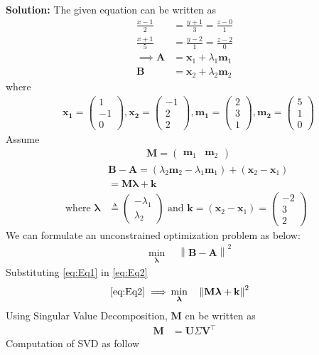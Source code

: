 \documentclass[12pt]{article}
\providecommand{\brak}[1]{\ensuremath{\left(#1\right)}}
\providecommand{\norm}[1]{\left\lVert#1\right\rVert}
\newcommand{\solution}{\noindent \textbf{Solution: }}
\newcommand{\myvec}[1]{\ensuremath{\begin{pmatrix}#1\end{pmatrix}}}
\let\vec\mathbf
\begin{document}
\begin{enumerate}
\solution 
The given equation can be written as
\begin{align}
	\frac{x-1}{2} &= \frac{y+1}{3}=\frac{z-0}{1}\\ 
	\frac{x+1}{5} &= \frac{y-2}{1}= \frac{z-2}{0} \\ 
	\implies 
	\vec{A} &= \vec{x}_1 + \lambda_1\vec{m}_1\\
	\vec{B} &= \vec{x}_2 + \lambda_2\vec{m}_2
\end{align}	
where
\begin{align}
	&\vec{x_1} = \myvec{1\\-1\\0},  
	\vec{x_2} = \myvec{-1\\2\\2},  
	\vec{m_1} = \myvec{2\\3\\1},
	\vec{m_2} = \myvec{5\\1\\0}  
\end{align}	
Assume
\begin{align}
	&\vec{M} = \myvec{\vec{m}_1 & \vec{m}_2} 
\end{align}
\begin{align}
	&\vec{B}-\vec{A} = \brak{\lambda_2\vec{m}_2 - \lambda_1\vec{m}_1} + \brak{\vec{x}_2- \vec{x}_1} \\ 
	\label{eq:Eq1}
	&= \vec{M}\bm{\lambda}+ \vec{k} \\
	\text{ where } \bm{\lambda} &\triangleq \myvec{-\lambda_1\\ \lambda_2}\text{ and }\vec{k} =\brak{\vec{x}_2- \vec{x}_1} = \myvec{-2 \\ 3 \\2}  
\end{align}
We can formulate an unconstrained optimization problem as below:
\begin{align}
	\label{eq:Eq2}
	&  \min_{\bm{\lambda}} \quad \norm{\vec{B}-\vec{A}}^2 
\end{align}
Substituting \eqref{eq:Eq1} in \eqref{eq:Eq2}
\begin{align}
	\label{eq:Eq3}
	\eqref{eq:Eq2} \implies 
	&  \min_{\bm{\lambda}} \quad \norm{\vec{M}\bm{\lambda}+\vec{k}}^2 
\end{align}
Using Singular Value Decomposition, $\vec{M}$ cn be written as
\begin{align}
	\label{eq:svd}
	\vec{M} &= \vec{U}\Sigma\vec{V}^\top 
\end{align}
Computation of  SVD as follow 
\begin{align}

\end{align}
\end{enumerate}
\end{document}
